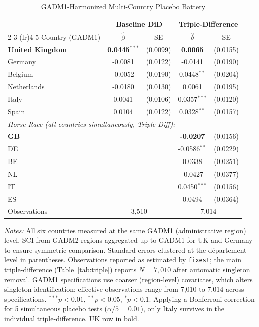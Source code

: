 \begin{table}[htbp]
\centering
\caption{GADM1-Harmonized Multi-Country Placebo Battery}
\label{tab:gadm1placebo}
\begin{threeparttable}
\begin{tabular}{lcccc}
\toprule
 & \multicolumn{2}{c}{Baseline DiD} & \multicolumn{2}{c}{Triple-Difference} \\
\cmidrule(lr){2-3} \cmidrule(lr){4-5}
Country (GADM1) & $\hat{\beta}$ & SE & $\hat{\delta}$ & SE \\
\midrule
\textbf{United Kingdom} & \textbf{0.0445$^{***}$} & (0.0099) & \textbf{0.0065} & (0.0155) \\
Germany & -0.0081 & (0.0122) & -0.0141 & (0.0190) \\
Belgium & -0.0052 & (0.0190) & 0.0448$^{**}$ & (0.0204) \\
Netherlands & -0.0180 & (0.0130) & 0.0061 & (0.0195) \\
Italy & 0.0041 & (0.0106) & 0.0357$^{***}$ & (0.0120) \\
Spain & 0.0104 & (0.0122) & 0.0328$^{**}$ & (0.0157) \\
\midrule
\multicolumn{5}{l}{\textit{Horse Race (all countries simultaneously, Triple-Diff):}} \\
\quad \textbf{GB} & & & \textbf{-0.0207} & (0.0156) \\
\quad DE & & & -0.0586$^{**}$ & (0.0229) \\
\quad BE & & & 0.0338 & (0.0251) \\
\quad NL & & & -0.0427 & (0.0377) \\
\quad IT & & & 0.0450$^{***}$ & (0.0156) \\
\quad ES & & & 0.0494 & (0.0364) \\
\midrule
Observations & \multicolumn{2}{c}{3,510} & \multicolumn{2}{c}{7,014} \\
\bottomrule
\end{tabular}
\begin{tablenotes}[flushleft]\footnotesize
\item \textit{Notes:} All six countries measured at the same GADM1 (administrative region) level. SCI from GADM2 regions aggregated up to GADM1 for UK and Germany to ensure symmetric comparison. Standard errors clustered at the d\'epartement level in parentheses. Observations reported as estimated by \texttt{fixest}; the main triple-difference (Table~\ref{tab:triple}) reports $N = 7{,}010$ after automatic singleton removal. GADM1 specifications use coarser (region-level) covariates, which alters singleton identification; effective observations range from 7,010 to 7,014 across specifications. $^{***}p<0.01$, $^{**}p<0.05$, $^{*}p<0.1$. Applying a Bonferroni correction for 5 simultaneous placebo tests ($\alpha/5 = 0.01$), only Italy survives in the individual triple-difference. UK row in bold.
\end{tablenotes}
\end{threeparttable}
\end{table}

